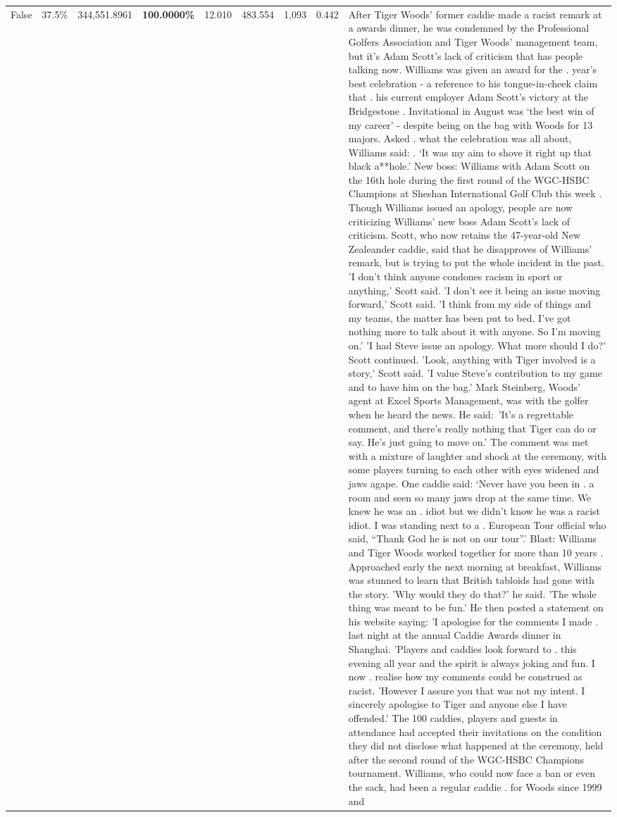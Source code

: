 \begin{table}[H]
\begin{tabular}{lllrlllll}
False & 37.5\% & 344,551.8961 & \bfseries \color{red} 100.0000\% & 12.010 & 483.554 & 1,093 & 0.442 & After Tiger Woods' former caddie made a racist remark at a awards dinner, he was condemned by the Professional Golfers Association and Tiger Woods' management team, but it's Adam Scott's lack of criticism that has people talking now. Williams was given an award for the . year’s best celebration - a reference to his tongue-in-cheek claim that . his current employer Adam Scott’s victory at the Bridgestone . Invitational in August was ‘the best win of my career’ - despite being on the bag with Woods for 13 majors. Asked . what the celebration was all about, Williams said: . ‘It was my aim to shove it right up that black a**hole.’ New boss: Williams with Adam Scott  on the 16th hole during the first round of the WGC-HSBC Champions at Sheshan International Golf Club this week . Though Williams issued an apology, people are now criticizing Williams' new boss Adam Scott's lack of criticism. Scott, who now retains the 47-year-old New Zealeander caddie, said that he disapproves of Williams' remark, but is trying to put the whole incident in the past. 'I don't think anyone condones racism in sport or anything,' Scott said. 'I don't see it being an issue moving forward,' Scott said. 'I think from my side of things and my teams, the matter has been put to bed. I've got nothing more to talk about it with anyone. So I'm moving on.' 'I had Steve issue an apology. What more should I do?' Scott continued. 'Look, anything with Tiger involved is a story,' Scott said. 'I value Steve's contribution to my game and to have him on the bag.' Mark Steinberg, Woods' agent at Excel Sports Management, was with the golfer when he heard the news. He said: 'It's a regrettable comment, and there's really nothing that Tiger can do or say. He's just going to move on.' The comment was met with a mixture of laughter and shock at the ceremony, with some players turning to each other with eyes widened and jaws agape. One caddie said: ‘Never have you been in . a room and seen so many jaws drop at the same time. We knew he was an . idiot but we didn’t know he was a racist idiot. I was standing next to a . European Tour official who said, “Thank God he is not on our tour”.’ Blast: Williams and Tiger Woods worked together for more than 10 years . Approached early the next morning at breakfast, Williams was stunned to learn that British tabloids had gone with the story. 'Why would they do that?' he said. 'The whole thing was meant to be fun.' He then posted a statement on his website saying: 'I apologise for the comments I made . last night at the annual Caddie Awards dinner in Shanghai. 'Players and caddies look forward to . this evening all year and the spirit is always joking and fun. I now . realise how my comments could be construed as racist. 'However I assure you that was not my intent. I sincerely apologise to Tiger and anyone else I have offended.' The 100 caddies, players and guests in attendance had accepted their invitations on the condition they did not disclose what happened at the ceremony, held after the second round of the WGC-HSBC Champions tournament. Williams, who could now face a ban or even the sack, had been a regular caddie . for Woods since 1999 and 
\end{tabular}
\end{table}
